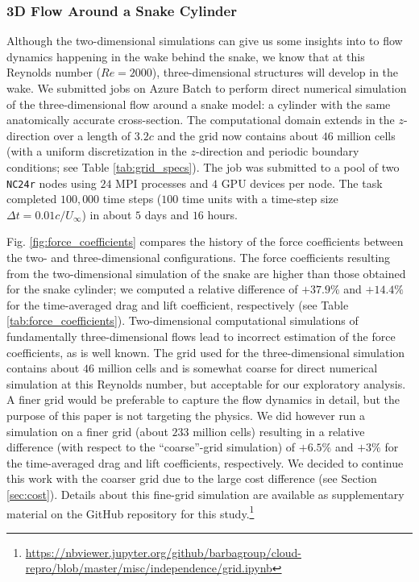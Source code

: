 \documentclass[10pt,journal,compsoc]{IEEEtran}
\begin{document}
\subsubsection{3D Flow Around a Snake Cylinder}

Although the two-dimensional simulations can give us some insights into to flow dynamics happening in the wake behind the snake, we know that at this Reynolds number ($Re = 2000$), three-dimensional structures will develop in the wake.
We submitted jobs on Azure Batch to perform direct numerical simulation of the three-dimensional flow around a snake model: a cylinder with the same anatomically accurate cross-section.
The computational domain extends in the $z$-direction over a length of $3.2c$ and the grid now contains about $46$ million cells (with a uniform discretization in the $z$-direction and periodic boundary conditions; see Table \ref{tab:grid_specs}).
The job was submitted to a pool of two \texttt{NC24r} nodes using $24$ MPI processes and $4$ GPU devices per node.
The task completed $100,000$ time steps ($100$ time units with a time-step size $\Delta t = 0.01 c / U_\infty$) in about $5$ days and $16$ hours.

Fig. \ref{fig:force_coefficients} compares the history of the force coefficients between the two- and three-dimensional configurations.
The force coefficients resulting from the two-dimensional simulation of the snake are higher than those obtained for the snake cylinder; we computed a relative difference of $+37.9\%$ and $+14.4\%$ for the time-averaged drag and lift coefficient, respectively (see Table \ref{tab:force_coefficients}).
Two-dimensional computational simulations of fundamentally three-dimensional flows lead to incorrect estimation of the force coefficients, as is well known\cite{mittal_balachandar_1995}.
The grid used for the three-dimensional simulation contains about $46$ million cells and is somewhat coarse for direct numerical simulation at this Reynolds number, but acceptable for our exploratory analysis.
A finer grid would be preferable to capture the flow dynamics in detail, but the purpose of this paper is not targeting the physics.
We did however run a simulation on a finer grid (about $233$ million cells) resulting in a relative difference (with respect to the ``coarse''-grid simulation) of $+6.5\%$ and $+3\%$ for the time-averaged drag and lift coefficients, respectively.
We decided to continue this work with the coarser grid due to the large cost difference (see Section \ref{sec:cost}).
Details about this fine-grid simulation are available as supplementary material on the GitHub repository for this study.\footnote{\url{https://nbviewer.jupyter.org/github/barbagroup/cloud-repro/blob/master/misc/independence/grid.ipynb}}
\end{document}

